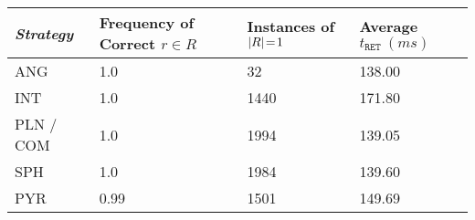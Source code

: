 
\begin{tabular}{m{}|m{}|m{}|m{}}
    \toprule
    \textit{Strategy} & Frequency of Correct $r\!\in\!R$ & Instances of $\left| R \right|\!=\! 1$ & Average $t_\texttt{RET} \ (\si{ms})$  \\ \hline
    ANG & \num{1.0} & \num{32} & \num{138.00} \\ \hline
    INT & \num{1.0} & \num{1440} & \num{171.80} \\ \hline
    PLN / COM & \num{1.0} & \num{1994} & \num{139.05} \\ \hline
    SPH & \num{1.0} & \num{1984} & \num{139.60} \\ \hline
    PYR & \num{0.99} & \num{1501} & \num{149.69} \\ \bottomrule
\end{tabular}